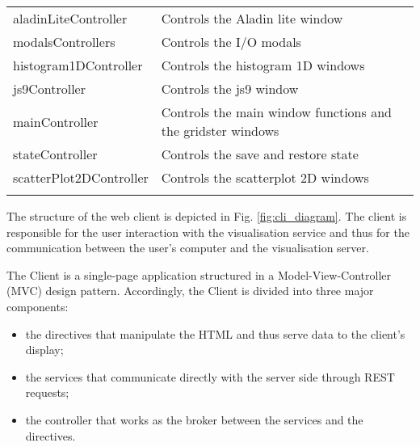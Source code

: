 \documentclass[longauth, final]{aa}
\begin{document}
\begin{table}[ht]
\begin{tabularx}{0.45\textwidth}{XX}
aladinLiteController & Controls the Aladin lite window\\    
    \noalign{\smallskip}%

modalsControllers & Controls the I/O modals\\    
    \noalign{\smallskip}%

histogram1DController & Controls the histogram 1D windows\\    
    \noalign{\smallskip}%

js9Controller & Controls the js9 window\\
    \noalign{\smallskip}%

mainController & Controls the main window functions and the gridster windows\\    
    \noalign{\smallskip}%
 
stateController & Controls the save and restore state\\
    \noalign{\smallskip}%
 
scatterPlot2DController & Controls the scatterplot 2D windows\\    
    \noalign{\smallskip}\hline    %
 
 \end{tabularx}
\end{table}

The structure of the web client is depicted in Fig. \ref{fig:cli_diagram}. The client is responsible for the user interaction with the visualisation service and thus for the communication between the user's computer and the visualisation server. 

The Client is a single-page application structured in a Model-View-Controller (MVC) design pattern. Accordingly, the Client is divided into three major components:

\begin{itemize}
\item the directives that manipulate the HTML and thus serve data to the client’s display;
\item the services that communicate directly with the server side through REST requests;
\item the controller that works as the broker between the services and the directives.
\end{itemize}
\end{document}
